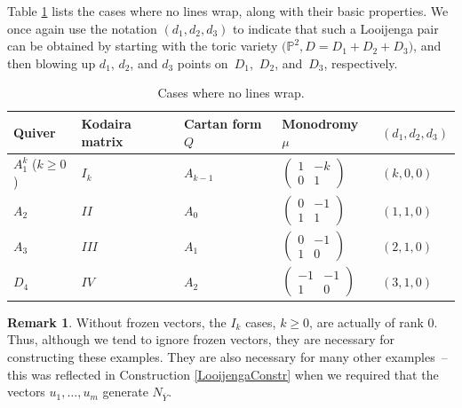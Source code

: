 \documentclass[10pt,a4paper]{amsart}
\numberwithin{equation}{section}
\numberwithin{figure}{section}
\numberwithin{table}{section}
\let\?=\overline
\let\bb=\mathbb
\theoremstyle{definition}
\newtheorem{rmk}[thm]{Remark}
\begin{document}
Table \ref{tab:no wrap} lists the cases where no lines wrap, along with their basic properties. We once again use the notation $(d_1,d_2,d_3)$ to indicate that such a Looijenga pair can be obtained by starting with the toric variety $\big(\bb{P}^2,D=D_1+D_2+D_3\big)$, and then blowing up $d_1$, $d_2$, and $d_3$ points on~$D_1$,~$D_2$, and~$D_3$, respectively.
\begin{table}[h]\centering
 \begin{tabular}{ | l | l | l | l | l|}
 \hline
 Quiver & Kodaira matrix & Cartan form $Q$ & Monodromy $\mu$ & $(d_1,d_2,d_3)$ \\ \hline
 $A_1^k$ ($k\geq 0$) & $I_{k}$ & $A_{k-1}$ & 	 $\left(\begin{matrix}
		1 &-k \\
	 0 &1
		\end{matrix}\right)$				 		& $(k,0,0)$ \\ \hline
 $A_2$ & $II$ & $A_0$ & 		$\left(\begin{matrix}
		0 &-1 \\
	 1 &1
		\end{matrix}\right)$		& $(1,1,0)$	 \\ \hline
 $A_3$ & $III$ &$A_1$ &	$\left(\begin{matrix}
		0 &-1 \\
	 1 &0
		\end{matrix}\right)$	 	 & $(2,1,0)$	 \\ \hline
 $D_4$ & $IV$ &$A_2$ & 	$\left(\begin{matrix}
		-1 &-1 \\
	 1 &0
		\end{matrix}\right)$			& $(3,1,0)$			 \\ \hline
 \end{tabular}
 \caption{Cases where no lines wrap.}\label{tab:no wrap}
\end{table}

\begin{rmk}\label{NeedFrozen}
Without frozen vectors, the $I_k$ cases, $k\geq 0$, are actually of rank $0$. Thus, although we tend to ignore frozen vectors, they are necessary for constructing these examples. They are also necessary for many other examples~-- this was reflected in Construction \ref{LooijengaConstr} when we required that the vectors $u_1,\dots,u_m$ generate $N_{\?{Y}}$.
\end{rmk}
\end{document}
